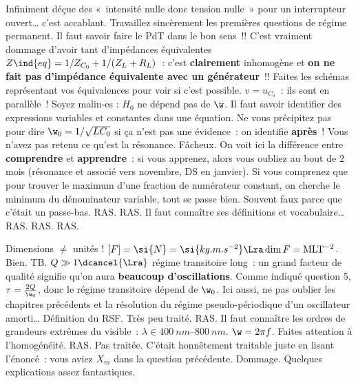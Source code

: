 \documentclass[a4paper, 12pt, final, garamond]{book}
\begin{document}
\setcounter{section}{0}
\begin{enumerate}
	Infiniment déçue des «~intensité nulle donc tension nulle~» pour un
	interrupteur ouvert… c'est accablant. Travaillez sincèrement les premières
	questions de régime permanent.
	Il faut savoir faire le PdT dans le bon sens~!! C'est vraiment dommage d'avoir
	tant d'impédances équivalentes $Z\ind{eq} = 1/Z_{C_0} + 1/(Z_L+R_L)$~: c'est
	\textbf{clairement} inhomogène et \textbf{on ne fait pas d'impédance
		équivalente avec un générateur}~!! Faites les schémas représentant vos
	équivalences pour voir si c'est possible.
	\smallbreak
	$v = u_{C_0}$~: ils sont en parallèle~!
	Soyez malin-es : $H_0$ ne dépend pas de $\w$. Il faut savoir identifier des
	expressions variables et constantes dans une équation. Ne vous précipitez pas
	pour dire $\w_0 = 1/\sqrt{LC_0}$ si ça n'est pas une évidence~: on identifie
	\textbf{après}~!
	Vous n'avez pas retenu ce qu'est la résonance. Fâcheux. On voit ici la
	différence entre \textbf{comprendre} et \textbf{apprendre}~: si vous apprenez,
	alors vous oubliez au bout de 2 mois (résonance et associé vers novembre, DS
	en janvier). Si vous comprenez que pour trouver le maximum d'une fraction de
	numérateur constant, on cherche le minimum du dénominateur variable, tout se
	passe bien.
	Souvent faux parce que c'était un passe-bas.
	RAS.
	RAS.
	Il faut connaître ses définitions et vocabulaire…
	RAS.
	RAS.
	RAS.
\end{enumerate}

\begin{enumerate}
	Dimensions $\neq $ unités ! $[F] = \si{N} = \si{kg.m.s^{-2}} \Lra \dim F =
		{\rm MLT^{-2}}$.
	Bien.
	TB.
	$Q \gg 1 \dcancel{\Lra}$ régime transitoire long~: un grand facteur de qualité
	signifie qu'on aura \textbf{beaucoup d'oscillations}. Comme indiqué question
	5, $\tau = \frac{2Q}{\w_0}$, donc le régime transitoire dépend de $\w_0$.
	Ici aussi, ne pas oublier les chapitres précédents et la résolution du régime
	pseudo-périodique d'un oscillateur amorti…
	Définition du RSF.
	Très peu traité.
	RAS.
	Il faut connaître les ordres de grandeurs extrêmes du visible~: $\lambda \in
		\SIrange{400}{800}{nm}$.
	$\w = 2\pi f$. Faites attention à l'homogénéité.
	RAS.
	Pas traitée.
	C'était honnêtement traitable juste en lisant l'énoncé~: vous aviez $X_m$ dans
	la question précédente.
	Dommage.
	Quelques explications assez fantastiques.
\end{enumerate}
\end{document}
